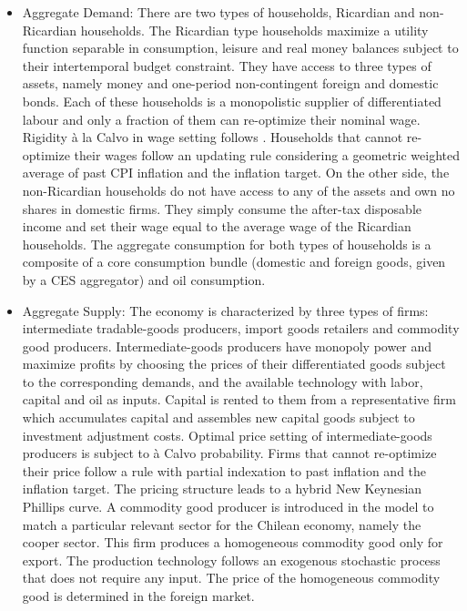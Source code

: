 \documentclass[11pt,a4paper]{article}
\begin{document}
	\begin{itemize}
		\item Aggregate Demand: There are two types of households, Ricardian and non-Ricardian households. The Ricardian type households maximize a utility function separable in consumption, leisure and real money balances subject to their intertemporal budget constraint. They have access to three types of assets, namely money and one-period non-contingent foreign and domestic bonds. Each of these households is a monopolistic supplier of differentiated labour and only a fraction of them can re-optimize their nominal wage. Rigidity \`{a} la Calvo in wage setting follows \cite{ErcegHendersonLevin2000}. Households that cannot re-optimize their wages follow an updating rule considering a geometric weighted average of past CPI inflation and the inflation target. On the other side, the non-Ricardian households do not have access to any of the assets and own no shares in domestic firms. They simply consume the after-tax disposable income and set their wage equal to the average wage of the Ricardian households. The aggregate consumption for both types of households is a composite of a core consumption bundle (domestic and foreign goods, given by a CES aggregator) and oil consumption.
		
		\item Aggregate Supply: The economy is characterized by three types of firms: intermediate tradable-goods producers, import goods retailers and commodity good producers. Intermediate-goods producers have monopoly power and maximize profits by choosing the prices of their differentiated goods subject to the corresponding demands, and the available technology with labor, capital and oil as inputs. Capital is rented to them from a representative firm which accumulates capital and assembles new capital goods subject to investment adjustment costs. Optimal price setting of intermediate-goods producers is subject to \`{a} Calvo probability. Firms that cannot re-optimize their price follow a rule with partial indexation to past inflation and the inflation target. The pricing structure leads to a hybrid New Keynesian Phillips curve. A commodity good producer is introduced in the model to match a particular relevant sector for the Chilean economy, namely the cooper sector. This firm produces a homogeneous commodity good only for export. The production technology follows an exogenous stochastic process that does not require any input. The price of the homogeneous commodity good is determined in the foreign market.
		

\end{itemize}
\end{document}
